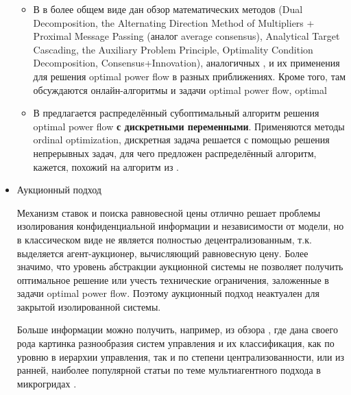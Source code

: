 \documentclass{report}
\begin{document}
\begin{itemize}
\begin{itemize}
\item
В \cite{molzahn2017survey} в более общем виде дан обзор математических методов 
(Dual Decomposition,
the Alternating Direction Method of Multipliers + Proximal Message Passing (аналог average consensus), Analytical Target Cascading, the Auxiliary Problem Principle, Optimality
Condition Decomposition, Consensus+Innovation),
аналогичных \cite{loia2013decentralized}, и их применения для решения optimal power flow в разных приближениях.
Кроме того, там обсуждаются онлайн-алгоритмы и задачи optimal power flow, optimal 

\item 
В \cite{lin2008distributed} предлагается распределённый субоптимальный алгоритм решения optimal power flow \textbf{с дискретными переменными}.
Применяются методы ordinal optimization, дискретная задача решается с помощью решения непрерывных задач, для чего предложен распределённый алгоритм, кажется, похожий на алгоритм из \cite{loia2013decentralized}.

\end{itemize}

\item Аукционный подход

Механизм ставок и поиска равновесной цены отлично решает проблемы изолирования конфиденциальной информации и независимости от модели, но в классическом виде не является полностью децентрализованным, т.к. выделяется агент-аукционер, вычисляющий равновесную цену.
Более значимо, что уровень абстракции аукционной системы не позволяет
получить оптимальное решение или учесть технические ограничения, заложенные в задачи optimal power flow.
Поэтому аукционный подход неактуален для закрытой изолированной системы.

Больше информации можно получить, например, из обзора \cite{olivares2014trends}, где дана своего рода картинка разнообразия систем управления и их классификация, как по уровню в иерархии управления, так и по степени централизованности, или из ранней, наиболее популярной статьи по теме мультиагентного подхода в микрогридах \cite{dimeas2005operation}.



\end{itemize}
\end{document}
